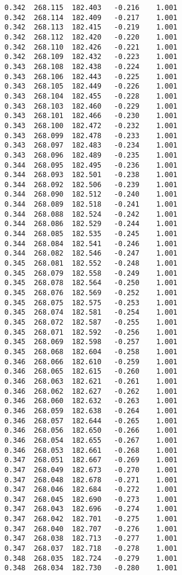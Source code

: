\begin{verbatim}
   0.342  268.115  182.403   -0.216    1.001
   0.342  268.114  182.409   -0.217    1.001
   0.342  268.113  182.415   -0.219    1.001
   0.342  268.112  182.420   -0.220    1.001
   0.342  268.110  182.426   -0.221    1.001
   0.342  268.109  182.432   -0.223    1.001
   0.343  268.108  182.438   -0.224    1.001
   0.343  268.106  182.443   -0.225    1.001
   0.343  268.105  182.449   -0.226    1.001
   0.343  268.104  182.455   -0.228    1.001
   0.343  268.103  182.460   -0.229    1.001
   0.343  268.101  182.466   -0.230    1.001
   0.343  268.100  182.472   -0.232    1.001
   0.343  268.099  182.478   -0.233    1.001
   0.343  268.097  182.483   -0.234    1.001
   0.343  268.096  182.489   -0.235    1.001
   0.344  268.095  182.495   -0.236    1.001
   0.344  268.093  182.501   -0.238    1.001
   0.344  268.092  182.506   -0.239    1.001
   0.344  268.090  182.512   -0.240    1.001
   0.344  268.089  182.518   -0.241    1.001
   0.344  268.088  182.524   -0.242    1.001
   0.344  268.086  182.529   -0.244    1.001
   0.344  268.085  182.535   -0.245    1.001
   0.344  268.084  182.541   -0.246    1.001
   0.344  268.082  182.546   -0.247    1.001
   0.345  268.081  182.552   -0.248    1.001
   0.345  268.079  182.558   -0.249    1.001
   0.345  268.078  182.564   -0.250    1.001
   0.345  268.076  182.569   -0.252    1.001
   0.345  268.075  182.575   -0.253    1.001
   0.345  268.074  182.581   -0.254    1.001
   0.345  268.072  182.587   -0.255    1.001
   0.345  268.071  182.592   -0.256    1.001
   0.345  268.069  182.598   -0.257    1.001
   0.345  268.068  182.604   -0.258    1.001
   0.346  268.066  182.610   -0.259    1.001
   0.346  268.065  182.615   -0.260    1.001
   0.346  268.063  182.621   -0.261    1.001
   0.346  268.062  182.627   -0.262    1.001
   0.346  268.060  182.632   -0.263    1.001
   0.346  268.059  182.638   -0.264    1.001
   0.346  268.057  182.644   -0.265    1.001
   0.346  268.056  182.650   -0.266    1.001
   0.346  268.054  182.655   -0.267    1.001
   0.346  268.053  182.661   -0.268    1.001
   0.347  268.051  182.667   -0.269    1.001
   0.347  268.049  182.673   -0.270    1.001
   0.347  268.048  182.678   -0.271    1.001
   0.347  268.046  182.684   -0.272    1.001
   0.347  268.045  182.690   -0.273    1.001
   0.347  268.043  182.696   -0.274    1.001
   0.347  268.042  182.701   -0.275    1.001
   0.347  268.040  182.707   -0.276    1.001
   0.347  268.038  182.713   -0.277    1.001
   0.347  268.037  182.718   -0.278    1.001
   0.348  268.035  182.724   -0.279    1.001
   0.348  268.034  182.730   -0.280    1.001

\end{verbatim}
